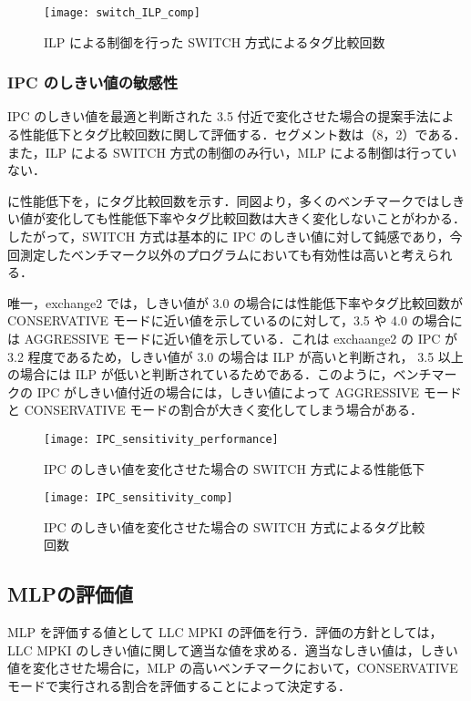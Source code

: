 \begin{figure}[htb]
  \centering
  \texttt{[image: switch\_ILP\_comp]}
  \caption{ILP による制御を行った SWITCH 方式によるタグ比較回数}
  \label{fig:switch_ILP_comp}
\end{figure}

\subsubsection{IPC のしきい値の敏感性}
IPC のしきい値を最適と判断された 3.5 付近で変化させた場合の提案手法による性能低下とタグ比較回数に関して評価する．セグメント数は（8，2）である．また，ILP による SWITCH 方式の制御のみ行い，MLP による制御は行っていない．

に性能低下を，にタグ比較回数を示す．同図より，多くのベンチマークではしきい値が変化しても性能低下率やタグ比較回数は大きく変化しないことがわかる．したがって，SWITCH 方式は基本的に IPC のしきい値に対して鈍感であり，今回測定したベンチマーク以外のプログラムにおいても有効性は高いと考えられる．

唯一，exchange2 では，しきい値が 3.0 の場合には性能低下率やタグ比較回数が CONSERVATIVE モードに近い値を示しているのに対して，3.5 や 4.0 の場合には AGGRESSIVE モードに近い値を示している．これは exchaange2 の IPC が 3.2 程度であるため，しきい値が 3.0 の場合は ILP が高いと判断され， 3.5 以上の場合には ILP が低いと判断されているためである．このように，ベンチマークの IPC がしきい値付近の場合には，しきい値によって AGGRESSIVE モードと CONSERVATIVE モードの割合が大きく変化してしまう場合がある．

\begin{figure}[htb]
  \centering
  \texttt{[image: IPC\_sensitivity\_performance]}
  \caption{IPC のしきい値を変化させた場合の SWITCH 方式による性能低下}
  \label{fig:IPC_sensitivity_performance}
\end{figure}

\begin{figure}[htb]
  \centering
  \texttt{[image: IPC\_sensitivity\_comp]}
  \caption{IPC のしきい値を変化させた場合の SWITCH 方式によるタグ比較回数}
  \label{fig:IPC_sensitivity_comp}
\end{figure}

\subsection{MLPの評価値}
MLP を評価する値として LLC MPKI の評価を行う．評価の方針としては，LLC MPKI のしきい値に関して適当な値を求める．適当なしきい値は，しきい値を変化させた場合に，MLP の高いベンチマークにおいて，CONSERVATIVE モードで実行される割合を評価することによって決定する．

